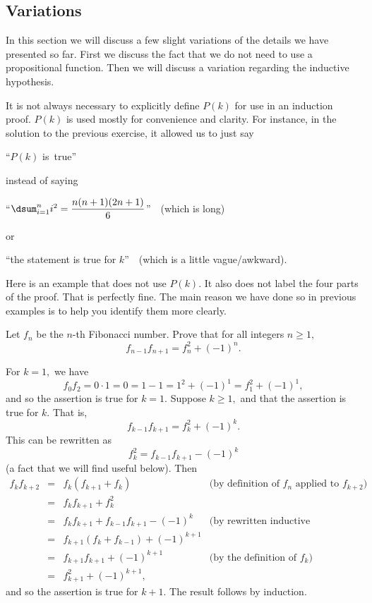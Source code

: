 \subsection{Variations}

In this section we will discuss a few slight variations of the details we have presented so far.
First we discuss the fact that we do not need to use a propositional function.
Then we will discuss a variation regarding the inductive hypothesis.

It is not always necessary to explicitly define $P(k)$ for use in an induction proof.
$P(k)$ is used mostly for convenience and clarity. For instance, in the solution to the previous
exercise, it allowed us to just say 
\begin{center}
``$P(k)$ \mbox{is true}''
\end{center}
instead of saying 
\begin{center}
``$\dsum _{i=1}^n i^2 = \dfrac{n(n+1)(2n+1)}{6}$''\, \,  (which is long)
\end{center}
or
\begin{center}
``the statement is true for $k$''\, \,  (which is a little vague/awkward).
\end{center}

Here is an example that does not use $P(k)$.  It also does not label the four parts of the proof.  
That is perfectly fine.  The main reason we have done so in previous examples 
is to help you identify them more clearly.

\begin{exa}
Let $f_n$ be the $n$-th Fibonacci number.
Prove that for all integers $n \geq 1,$
$$f_{n - 1}f_{n + 1} = f_n ^2 + (-1)^{n}.$$ 
\begin{pf}
For $k = 1,$ we have
$$f_0f_2= 0\cdot 1 = 0 = 1 - 1 = 1^2 + (-1)^1 = f_1^2 +  (-1)^1,$$
and so the assertion is true for $k = 1.$ 
Suppose $k \geq 1,$ and  that the
assertion is true for $k$.  That is,
$$f_{k - 1}f_{k + 1} = f_k ^2 + (-1)^{k}.$$
This can be rewritten as 
$$f_k ^2  = f_{k - 1}f_{k + 1} -(-1)^{k}$$
(a fact that we will find useful below).
Then 
$$\begin{array}{llll}
f_{k}f_{k + 2} & =  & f_k(f_{k + 1} + f_k) &\mbox{(by definition of $f_n$ applied to $f_{k+2}$)}\\
& = & f_kf_{k + 1} + f_k ^2\\
& = & f_kf_{k + 1} + f_{k - 1}f_{k + 1} - (-1)^{k} &\mbox{(by rewritten inductive hypothesis)}\\
& = & f_{k + 1}(f_k + f_{k - 1}) + (-1)^{k + 1} \\
& = & f_{k + 1}f_{k + 1} + (-1)^{k + 1}&\mbox{(by the definition of $f_k$)}\\
& = & f_{k + 1}^2 + (-1)^{k + 1},
\end{array}$$
and so the assertion is true for $k+1$.
The result follows by induction.
\end{pf}
\end{exa}

